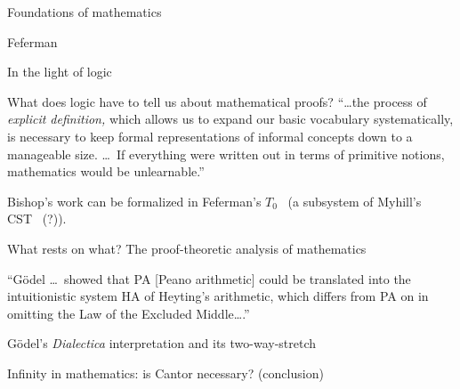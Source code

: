 \begin{plSection}{Foundations of mathematics}
\begin{plSection}{Feferman}
\begin{plSection}{In the light of logic}
\begin{plSection}{What does logic have to tell us about mathematical proofs?}
``\ldots the process of \textit{explicit definition,} which allows
us to expand our basic vocabulary systematically,
is necessary to keep formal representations of informal concepts
down to a manageable size. \ldots\ 
If everything were written out in terms of primitive notions,
mathematics would be 
unlearnable.''~\cite[p~180]{Feferman:1998:LightOfLogic}

Bishop's work can be formalized 
in Feferman's $T_0$~\cite{Feferman:1975:ExplicitMathematics}
(a subsystem of Myhill's CST~\cite{Myhill:1975:ConstSetTheory} (?)).

\end{plSection}%
\begin{plSection}{What rests on what? The proof-theoretic analysis of mathematics}
\label{sec:What_rests_on_what}

\cite[ch~10 ``What rests on what? 
The proof-theoretic analysis of mathematics'']{Feferman:1998:LightOfLogic}

``G\"{o}del \ldots\ showed that PA [Peano arithmetic]
could be translated into the intuitionistic system HA of
Heyting's arithmetic,
which differs from PA on in omitting the 
Law of the Excluded Middle{\ldots}.''~\cite[190]{Feferman:1998:LightOfLogic}

\end{plSection}%
\begin{plSection}{G\"{o}del's \textit{Dialectica} interpretation and its two-way-stretch}
\label{sec:Godels_Dialectica_interpretation}

\cite[ch~11 ``G\"{o}del's \textit{Dialectica} interpretation and its
two-way-stretch'']{Feferman:1998:LightOfLogic}

\end{plSection}%
\begin{plSection}{Infinity in mathematics: is Cantor necessary? (conclusion)}
\label{sec:Cantor_necessary_conclusion}

\cite[ch~12 ``Infinity in mathematics: is Cantor necessary? (conclusion)'']
{Feferman:1998:LightOfLogic}


\end{plSection}
\end{plSection}
\end{plSection}
\end{plSection}
